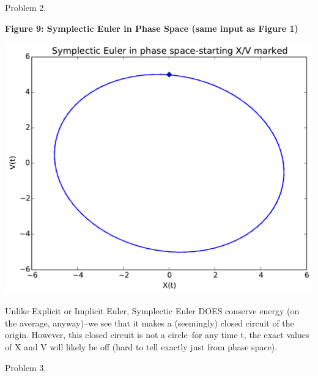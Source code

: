 \documentclass{article}
\begin{document}
\bigskip

Problem 2.


\begin{minipage}{1.0\textwidth}
\begin{center}
    \textbf{Figure 9: Symplectic Euler in Phase Space (same input as Figure 1)}\par\medskip
    \includegraphics[scale=0.7]{symp_phaseSpace}
\end{center}
\end{minipage}

Unlike Explicit or Implicit Euler, Symplectic Euler DOES conserve energy (on the average, anyway)--we see that it makes a (seemingly) closed circuit of the origin. However, this closed circuit is not a circle--for any time t, the exact values of X and V will likely be off (hard to tell exactly just from phase space). 

\bigskip

Problem 3.
\end{document}
